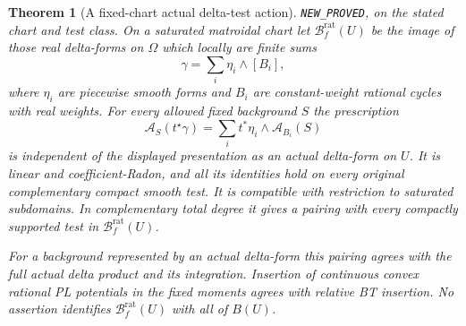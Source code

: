 \documentclass[11pt,a4paper]{article}
\numberwithin{equation}{section}
\newtheorem{theorem}{Theorem}[section]
\theoremstyle{definition}
\theoremstyle{remark}
\begin{document}
\begin{theorem}[A fixed-chart actual delta-test action]
\label{thm:r6-matroidal-delta-action}
\textnormal{\texttt{NEW\_PROVED}}, on the stated chart and test class.
On a saturated matroidal chart let $\mathscr B_f^{\mathrm{rat}}(U)$
be the image of those real delta-forms on $\Omega$ which locally
are finite sums
\[
                          \gamma=\sum_i\eta_i\wedge[B_i],
\]
where $\eta_i$ are piecewise smooth forms and $B_i$ are
constant-weight rational cycles with real weights.
For every allowed fixed background $S$ the prescription
\[
             \mathcal A_S(t^\star\gamma)
                  =\sum_i t^*\eta_i\wedge\mathcal A_{B_i}(S)
\]
is independent of the displayed presentation as an \emph{actual}
delta-form on $U$.  It is linear and coefficient-Radon, and all
its identities hold on every original complementary compact
smooth test.  It is compatible with restriction to saturated
subdomains.  In complementary total degree it gives a pairing
with every compactly supported test in
$\mathscr B_f^{\mathrm{rat}}(U)$.

For a background represented by an actual delta-form this pairing
agrees with the full actual delta product and its integration.
Insertion of continuous convex rational PL potentials in the
fixed moments agrees with relative BT insertion.  No assertion
identifies $\mathscr B_f^{\mathrm{rat}}(U)$ with all of $B(U)$.
\end{theorem}
\end{document}
